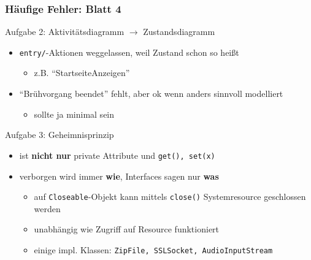 \documentclass[18pt]{beamer}
\begin{document}
	\begin{frame}
		\frametitle{Häufige Fehler: Blatt 4}
		\begin{block}{Aufgabe 2: Aktivitätsdiagramm $\rightarrow$ Zustandsdiagramm}
			\pause
			\begin{itemize}
				\item \texttt{entry/}-Aktionen weggelassen, weil Zustand schon so heißt
				\begin{itemize}
					\item z.B. \enquote{StartseiteAnzeigen}
				\end{itemize} \pause
				\item \enquote{Brühvorgang beendet} fehlt, aber ok wenn anders sinnvoll modelliert
				\begin{itemize}
					\item sollte ja minimal sein
				\end{itemize}
			\end{itemize}
		\end{block}
		\pause 
		\begin{block}{Aufgabe 3: Geheimnisprinzip}
			\pause
			\begin{itemize}
				\item ist \textbf{nicht nur} private Attribute und \texttt{get(), set(x)} \pause
				\item verborgen wird immer \textbf{wie}, Interfaces sagen nur \textbf{was}
				\begin{itemize}
					\item auf \texttt{Closeable}-Objekt kann mittels \texttt{close()} Systemresource geschlossen werden
					\item unabhängig wie Zugriff auf Resource funktioniert
					\item einige impl. Klassen: \texttt{ZipFile, SSLSocket, AudioInputStream}
				\end{itemize}
			\end{itemize}
		\end{block}
	\end{frame}
\end{document}
